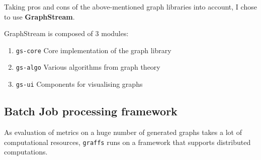         Taking pros and cons of the above-mentioned graph libraries into account, I chose to use \textbf{GraphStream}.
        
        GraphStream is composed of 3 modules:
        
        \begin{enumerate}
            \item \texttt{gs-core} Core implementation of the graph library
            \item \texttt{gs-algo} Various algorithms from graph theory
            \item \texttt{gs-ui} Components for visualising graphs
        \end{enumerate}

    \subsection{Batch Job processing framework}
        
        As evaluation of metrics on a huge number of generated graphs takes a lot of computational resources, \texttt{graffs} runs on a framework that supports distributed computations.
    
